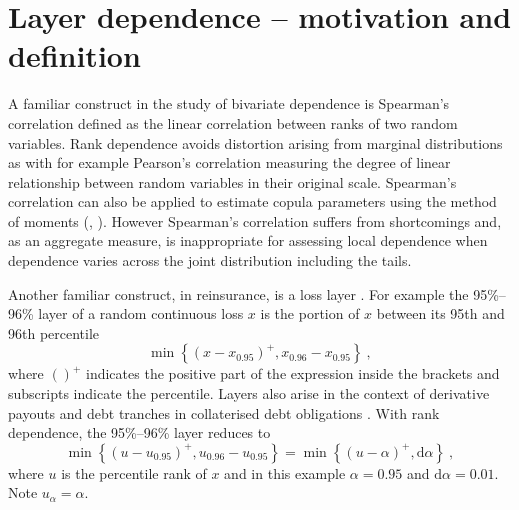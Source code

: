 \documentclass[authoryear]{elsarticle}
\newcommand{\de}{\mathrm{d}}
\begin{document}

\section{Layer dependence -- motivation and definition}\label{sintroduction}

A familiar construct in the study of bivariate dependence is Spearman's correlation \citep{embrechts2002correlation} defined as the linear correlation between ranks of two random variables. Rank dependence avoids distortion arising from marginal distributions as with for example Pearson's correlation \citep{mcneil2005qrm} measuring the degree of linear relationship between random variables in their original scale. Spearman's correlation can also be applied to estimate copula parameters using the method of moments (\cite{kojadinovic2010comparison}, \cite{bouye2000copulas}). However Spearman's correlation suffers from shortcomings and, as an aggregate measure, is inappropriate for assessing local dependence when dependence varies across the joint distribution including the tails.


Another familiar construct, in reinsurance, is a loss layer \citep{wang1995insurance}.  For example the 95\%--96\% layer of a random continuous loss $x$ is the portion of $x$ between its 95th and 96th percentile
$$
\min\left\{(x-x_{0.95})^+,x_{0.96}-x_{0.95}\right\}\ ,
$$
where $()^+$ indicates the positive part of the expression inside the brackets and subscripts indicate the percentile. Layers also arise in the context of derivative payouts and debt tranches in collaterised debt obligations \citep{mandel2012role}.  With rank dependence, the 95\%--96\% layer reduces to
\begin{equation}\label{eg}
\min\left\{(u-u_{0.95})^+,u_{0.96}-u_{0.95}\right\} = \min\left\{(u-\alpha)^+,\de\alpha\right\}\ ,
\end{equation}
where $u$ is the percentile rank of $x$ and in this example $\alpha=0.95$ and $\de \alpha=0.01$.  Note $u_\alpha=\alpha$.
\end{document}
